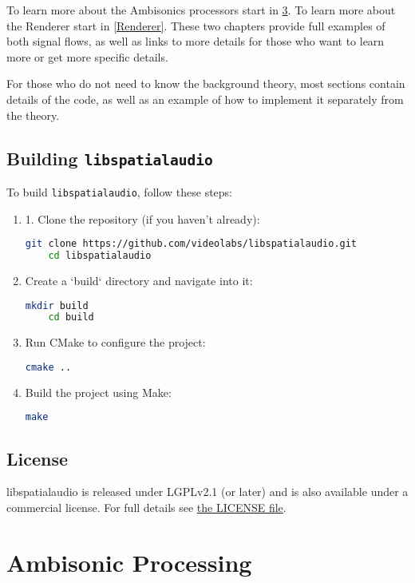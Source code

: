 \documentclass[12pt]{report}
\def\libspataud{\texttt{libspatialaudio}\xspace}
\begin{document}
To learn more about the Ambisonics processors start in \cref{Ambisonics}.
To learn more about the Renderer start in \cref{Renderer}.
These two chapters provide full examples of both signal flows, as well as links to more details for those who want to learn more or get more specific details.

For those who do not need to know the background theory, most sections contain details of the code, as well as an example of how to implement it separately from the theory.

\section{Building \libspataud}

To build \libspataud, follow these steps:
\begin{enumerate}
    \item 1. Clone the repository (if you haven't already):
\begin{lstlisting}[language=bash]
    git clone https://github.com/videolabs/libspatialaudio.git
    cd libspatialaudio
\end{lstlisting}
\item  Create a `build` directory and navigate into it:
\begin{lstlisting}[language=bash]
    mkdir build
    cd build
\end{lstlisting}
\item Run CMake to configure the project:
\begin{lstlisting}[language=bash]
    cmake ..
\end{lstlisting}
\item Build the project using Make:
\begin{lstlisting}[language=bash]
    make
\end{lstlisting}
\end{enumerate}

\section{License}

libspatialaudio is released under LGPLv2.1 (or later) and is also available
under a commercial license. For full details see \href{https://github.com/videolabs/libspatialaudio/blob/master/LICENSE}{the LICENSE file}.

\chapter{Ambisonic Processing}\label{Ambisonics}
\end{document}
